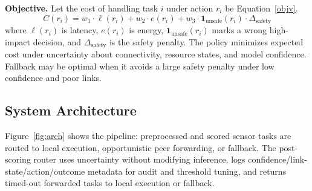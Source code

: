 \documentclass[10pt, conference]{IEEEtran}
\begin{document}



\noindent\textbf{Objective.} Let the cost of handling task $i$ under action $r_i$ be Equation~\ref{objv}.
\begin{equation}
    C(r_i) = w_1 \cdot \ell(r_i) + w_2 \cdot e(r_i) + w_3 \cdot \mathbf{1}_{\text{unsafe}}(r_i) \cdot \Delta_{\text{safety}}\label{objv}
\end{equation}
where $\ell(r_i)$ is latency, $e(r_i)$ is energy, $\mathbf{1}_{\text{unsafe}}(r_i)$ marks a wrong high-impact decision, and $\Delta_{\text{safety}}$ is the safety penalty. The policy minimizes expected cost under uncertainty about connectivity, resource states, and model confidence. Fallback may be optimal when it avoids a large safety penalty under low confidence and poor links.


\subsection{System Architecture}
Figure~\ref{fig:arch} shows the pipeline: preprocessed and scored sensor tasks are routed to local execution, opportunistic peer forwarding, or fallback. The post-scoring router uses uncertainty without modifying inference, logs confidence/link-state/action/outcome metadata for audit and threshold tuning, and returns timed-out forwarded tasks to local execution or fallback.
\end{document}
